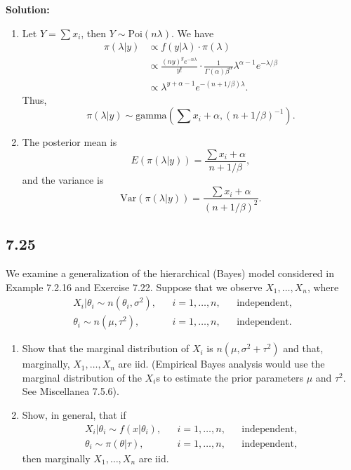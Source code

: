 \documentclass[11pt]{article}
\newcommand{\Sol}{\par {\bf Solution:}}
\newcommand{\sample}[1]{#1_1 , \dots , #1_n}
\begin{document}
\Sol
\begin{enumerate}[label=(\alph*)]
    \item
    Let $Y = \sum x_i$, then $Y \sim \text{Poi}(n\lambda)$.
    We have
    \begin{align*}
        \pi(\lambda|y) &\propto f(y|\lambda) \cdot \pi(\lambda) \\
        &\propto \frac{(ny)^y e^{-n\lambda}}{y!} \cdot \frac{1}{\Gamma(\alpha)\beta^\alpha}\lambda^{\alpha - 1}e^{-\lambda/\beta} \\
        &\propto \lambda^{y+\alpha - 1}e^{-(n + 1/\beta) \lambda}.
    \end{align*}
    Thus,
    \[
    \pi(\lambda|y) \sim \text{gamma}(\sum x_i + \alpha, (n+ 1/\beta)^{-1}). 
    \]
    \item
    The posterior mean is 
    \[
    E(\pi(\lambda|y)) = \frac{\sum x_i + \alpha}{n+ 1/\beta},
    \]
    and the variance is 
    \[
    \text{Var}(\pi(\lambda|y)) = \frac{\sum x_i + \alpha}{(n+ 1/\beta)^2}.
    \]
\end{enumerate}

\subsection*{7.25}
We examine a generalization of the hierarchical (Bayes) model considered in Example 7.2.16 and Exercise 7.22. Suppose that we observe $\sample{X}$, where
\begin{align*}
    X_i|\theta_i \sim n(\theta_i, \sigma^2), && i = 1, \dots, n, && \text{independent,} \\
    \theta_i \sim n(\mu, \tau^2), && i = 1, \dots, n, && \text{independent.}
\end{align*}

\begin{enumerate}[label=(\alph*)]
    \item Show that the marginal distribution of $X_i$ is $n(\mu, \sigma^2 + \tau^2)$ and that, marginally, $\sample{X}$ are iid. (Empirical Bayes analysis would use the marginal distribution
of the $X_i$s to estimate the prior parameters $\mu$ and $\tau^2$. See Miscellanea 7.5.6).
    \item Show, in general, that if
    \begin{align*}
    X_i|\theta_i \sim f(x|\theta_i), && i = 1, \dots, n, && \text{independent,} \\
    \theta_i \sim \pi(\theta|\tau), && i = 1, \dots, n, && \text{independent,}
    \end{align*}
    then marginally $\sample{X}$ are iid.
\end{enumerate}
\end{document}
